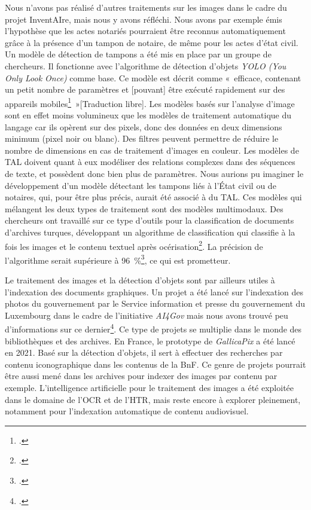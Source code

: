 Nous n'avons pas réalisé d'autres traitements sur les images dans le
cadre du projet InventAIre, mais nous y avons réfléchi. Nous avons par
exemple émis l'hypothèse que les actes notariés pourraient être
reconnus automatiquement grâce à la présence d'un tampon de notaire, de
même pour les actes d'état civil. Un modèle de détection de tampons a
été mis en place par un groupe de chercheurs. Il fonctionne avec l'algorithme de détection d'objets \emph{YOLO (You Only
Look Once)} comme base. Ce modèle est décrit comme «~efficace, contenant
un petit nombre de paramètres et {[}pouvant{]} être exécuté rapidement
sur des appareils mobiles\footcite{gayer_fast_2022}~»[Traduction libre]. Les modèles basés sur
l'analyse d'image sont en effet moins volumineux que les modèles de
traitement automatique du langage car ils opèrent sur des pixels, donc des données en deux dimensions minimum (pixel
noir ou blanc). Des filtres peuvent permettre de réduire le nombre de
dimensions en cas de traitement d'images en couleur. Les modèles de TAL
doivent quant à eux modéliser des relations complexes dans des séquences
de texte, et possèdent donc bien plus de paramètres. Nous aurions pu
imaginer le développement d'un modèle détectant les tampons liés à l'État
civil ou de notaires, qui, pour être plus précis, aurait été
associé à du TAL. Ces modèles qui mélangent les deux types de traitement
sont des modèles multimodaux. Des chercheurs ont travaillé sur ce type
d'outils pour la classification de documents d'archives turques, développant
 un algorithme de classification qui classifie à la fois les
images et le contenu textuel après océrisation\footcite{durukan_multimodal_2024}. La précision de
l'algorithme serait supérieure à 96~\%\footcite{durukan_multimodal_2024}, ce qui est prometteur.

Le traitement des images et la détection d'objets sont par ailleurs utiles
à l'indexation des documents graphiques. Un projet a été lancé sur
l'indexation des photos du gouvernement par le Service information et
presse du gouvernement du Luxembourg dans le cadre de l'initiative
\emph{AI4Gov} mais nous avons trouvé peu d'informations sur ce
dernier\footcite{noauthor_initiative_2021}.
Ce type de projets se multiplie dans le monde des bibliothèques et des
archives. En France, le prototype de \emph{GallicaPix} a été lancé en
2021. Basé sur la détection d'objets, il sert à effectuer des recherches par contenu iconographique dans les contenus de la BnF.
Ce genre de projets pourrait être aussi mené dans les archives pour indexer des images par contenu par exemple.
L'intelligence artificielle pour le traitement des images a été exploitée dans le domaine de l'\gls{OCR} et de l'\gls{HTR}, mais 
reste encore à explorer pleinement, notamment pour l'indexation automatique de contenu audiovisuel.

